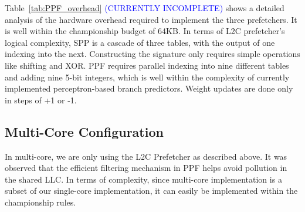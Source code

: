 Table~\ref{tab:PPF_overhead} \textcolor{blue}{(CURRENTLY INCOMPLETE)} shows a
detailed analysis of the hardware overhead required to implement the three
prefetchers. It is well within the championship budget of 64KB. In terms of
L2C prefetcher's logical complexity, SPP is a cascade of three tables, with
the output of one indexing into the next. Constructing the signature only
requires simple operations like shifting and XOR. PPF requires parallel
indexing into nine different tables and adding nine 5-bit integers, which is
well within the complexity of currently implemented perceptron-based branch
predictors.  Weight updates are done only in steps of +1 or -1.

\subsection{Multi-Core Configuration}
\label{Config-Multi}

In multi-core, we are only using the L2C Prefetcher as described above. It was
observed that the efficient filtering mechanism in PPF helps avoid pollution
in the shared LLC. In terms of complexity, since multi-core implementation is
a subset of our single-core implementation, it can easily be implemented
within the championship rules.
